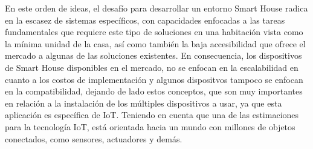 En este orden de ideas, el desafío para desarrollar un entorno Smart House radica en la escasez de sistemas específicos, con capacidades enfocadas a las tareas fundamentales que requiere este tipo de soluciones en una habitación vista como la mínima unidad de la casa, así como también la baja accesibilidad que ofrece el mercado a algunas de las soluciones existentes. En consecuencia, los dispositivos de Smart House disponibles en el mercado, no se enfocan en la escalabilidad en cuanto a los costos de implementación y algunos dispositvos tampoco se enfocan en la compatibilidad, dejando de lado estos conceptos, que son muy importantes en relación a la instalación de los múltiples dispositivos a usar, ya que esta aplicación es específica de IoT. Teniendo en cuenta que una de las estimaciones para la tecnología IoT, está orientada hacia un mundo con millones de objetos conectados, como sensores, actuadores y demás.\\
